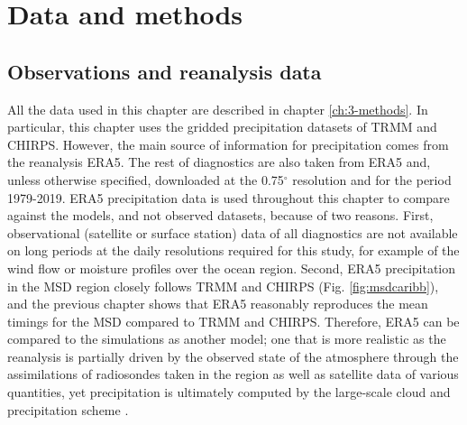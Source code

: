 






\section{Data and methods}

\subsection{Observations and reanalysis data}

All the data used in this chapter are described in chapter \ref{ch:3-methods}. In particular, this chapter uses the gridded precipitation datasets of TRMM and CHIRPS. However, the main source of information for precipitation comes from the reanalysis ERA5. The rest of diagnostics are also taken from ERA5 and, unless otherwise specified, downloaded at the 0.75$^\circ$ resolution and for the period 1979-2019. ERA5 precipitation data is used throughout this chapter to compare against the models, and not observed datasets, because of two reasons. First, observational (satellite or surface station) data of all diagnostics are not available on long periods at the daily resolutions required for this study, for example of the wind flow or moisture profiles over the ocean region. Second, ERA5 precipitation in the MSD region closely follows TRMM and CHIRPS (Fig. \ref{fig:msdcaribb}), and the previous chapter shows that ERA5 reasonably reproduces the mean timings for the MSD compared to TRMM and CHIRPS. Therefore, ERA5 can be compared to the simulations as another model; one that is more realistic as the reanalysis is partially driven by the observed state of the atmosphere through the assimilations of radiosondes taken in the region as well as satellite data of various quantities, yet precipitation  is ultimately computed by the large-scale cloud and precipitation scheme \citep{era5hersbach}.

